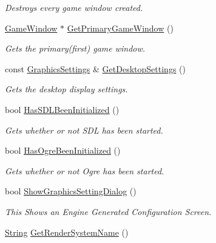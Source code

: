 \begin{DoxyCompactItemize}
\begin{DoxyCompactList}\small\item\em Destroys every game window created. \item\end{DoxyCompactList}\item 
\hyperlink{classphys_1_1GameWindow}{GameWindow} $\ast$ \hyperlink{classphys_1_1GraphicsManager_a4a0ef06c307c1521f60d39bd7a020643}{GetPrimaryGameWindow} ()
\begin{DoxyCompactList}\small\item\em Gets the primary(first) game window. \item\end{DoxyCompactList}\item 
const \hyperlink{structphys_1_1GraphicsSettings}{GraphicsSettings} \& \hyperlink{classphys_1_1GraphicsManager_ab2b1a8f5e714454f26f936bd746b256a}{GetDesktopSettings} ()
\begin{DoxyCompactList}\small\item\em Gets the desktop display settings. \item\end{DoxyCompactList}\item 
bool \hyperlink{classphys_1_1GraphicsManager_ad07600281c765e22bc413a1a9df1a22c}{HasSDLBeenInitialized} ()
\begin{DoxyCompactList}\small\item\em Gets whether or not SDL has been started. \item\end{DoxyCompactList}\item 
bool \hyperlink{classphys_1_1GraphicsManager_ab7ab98ff594726f8cc6d3ca0fac0ecdf}{HasOgreBeenInitialized} ()
\begin{DoxyCompactList}\small\item\em Gets whether or not Ogre has been started. \item\end{DoxyCompactList}\item 
bool \hyperlink{classphys_1_1GraphicsManager_adcded385b6442aa5da6097f1edd5471a}{ShowGraphicsSettingDialog} ()
\begin{DoxyCompactList}\small\item\em This Shows an Engine Generated Configuration Screen. \item\end{DoxyCompactList}\item 
\hyperlink{namespacephys_aa03900411993de7fbfec4789bc1d392e}{String} \hyperlink{classphys_1_1GraphicsManager_a9138c2f79ff9b711494089802724615e}{GetRenderSystemName} ()

\end{DoxyCompactItemize}
